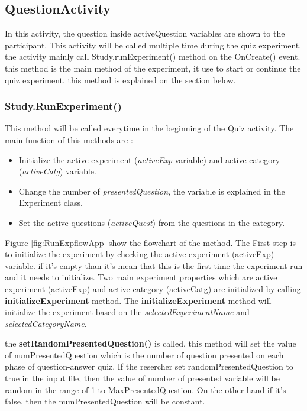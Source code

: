 \subsection{QuestionActivity}

In this activity, the question inside activeQuestion variables are shown to the participant. This activity will be called multiple time during the quiz experiment.
the activity mainly call Study.runExperiment() method on the OnCreate() event. this method is the main method of the experiment, it use to start or continue the quiz experiment. this method is explained on the section below.

\subsubsection{Study.RunExperiment()}
This method will be called everytime in the beginning of the Quiz activity.
The main function of this methods are :
\begin{itemize}
\item Initialize the active experiment (\textit{activeExp} variable) and active category (\textit{activeCatg}) variable.
\item Change the number of \textit{presentedQuestion}, the variable is explained in the Experiment class.
\item Set the active questions (\textit{activeQuest}) from the questions in the category.
\end{itemize}

Figure \ref{fig:RunExpflowApp} show the flowchart of the method. The First step is to initialize the experiment by checking the active experiment (activeExp) variable. if it's empty than it's mean that this is the first time the experiment run and it needs to initialize.
Two main experiment properties which are active experiment (activeExp) and active category (activeCatg) are initialized by calling \textbf{initializeExperiment} method. The \textbf{initializeExperiment} method will initialize the experiment based on the \textit{selectedExperimentName} and \textit{selectedCategoryName}.


the \textbf{setRandomPresentedQuestion()} is called, this method will set the value of numPresentedQuestion which is the number of question presented on each phase of question-answer quiz. If the resercher set randomPresentedQuestion to true in the input file, then the value of number of presented variable will be random in the range of 1 to MaxPresentedQuestion. On the other hand if it's false, then the numPresentedQuestion will be constant.

